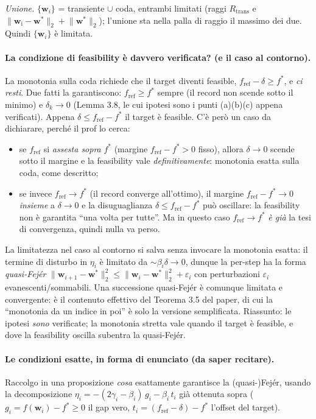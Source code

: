 \documentclass[11pt,a4paper]{article}
\theoremstyle{definition}
\newcommand{\w}{\bm{w}}
\newcommand{\wstar}{\w^{*}}
\newcommand{\fstar}{f^{*}}
\newcommand{\fref}{f_{\mathrm{ref}}}
\newcommand{\eps}{\varepsilon}
\newcommand{\norm}[1]{\lVert #1\rVert}
\begin{document}
\emph{Unione.} $\{\w_i\}$ = transiente $\cup$ coda, entrambi limitati (raggi $R_{\mathrm{trans}}$
e $\norm{\w_{\bar\imath}-\wstar}_2+\norm{\wstar}_2$); l'unione sta nella palla di raggio il
massimo dei due. Quindi $\{\w_i\}$ è limitata.

\paragraph{La condizione di feasibility è davvero verificata? (e il caso al contorno).}
La monotonia sulla coda richiede che il target diventi feasible, $\fref-\delta\ge\fstar$, e
\emph{ci resti}. Due fatti la garantiscono: $\fref\ge\fstar$ sempre (il record non scende sotto
il minimo) e $\delta_k\to0$ (Lemma 3.8, le cui ipotesi sono i punti (a)(b)(c) appena
verificati). Appena $\delta\le\fref-\fstar$ il target è feasible. C'è però un caso da
dichiarare, perché il prof lo cerca:
\begin{itemize}[leftmargin=1.4em]
\item se $\fref$ si \emph{assesta sopra} $\fstar$ (margine $\fref-\fstar>0$ fisso), allora
$\delta\to0$ scende sotto il margine e la feasibility vale \emph{definitivamente}: monotonia
esatta sulla coda, come descritto;
\item se invece $\fref\to\fstar$ (il record converge all'ottimo), il margine
$\fref-\fstar\to0$ \emph{insieme} a $\delta\to0$ e la disuguaglianza $\delta\le\fref-\fstar$
può oscillare: la feasibility non è garantita ``una volta per tutte''. Ma in questo caso
$\fref\to\fstar$ \emph{è già} la tesi di convergenza, quindi nulla va perso.
\end{itemize}
La limitatezza nel caso al contorno si salva senza invocare la monotonia esatta: il termine di
disturbo in $\eta_i$ è limitato da $\sim\beta_i\delta\to0$, dunque la per-step ha la forma
\emph{quasi-Fej\'er} $\norm{\w_{i+1}-\wstar}_2^2\le\norm{\w_i-\wstar}_2^2+\eps_i$ con
perturbazioni $\eps_i$ evanescenti/sommabili. Una successione quasi-Fej\'er è comunque limitata
e convergente: è il contenuto effettivo del Teorema 3.5 del paper, di cui la ``monotonia da un
indice in poi'' è solo la versione semplificata. Riassunto: le ipotesi \emph{sono} verificate;
la monotonia stretta vale quando il target è feasible, e dove la feasibility oscilla subentra
la quasi-Fej\'er.

\paragraph{Le condizioni esatte, in forma di enunciato (da saper recitare).}
Raccolgo in una proposizione \emph{cosa} esattamente garantisce la (quasi-)Fej\'er, usando la
decomposizione $\eta_i=-(2\gamma_i-\beta_i)\,g_i-\beta_i\,t_i$ già ottenuta sopra
($g_i=f(\w_i)-\fstar\ge0$ il gap vero, $t_i=(\fref-\delta)-\fstar$ l'offset del target).
\end{document}
